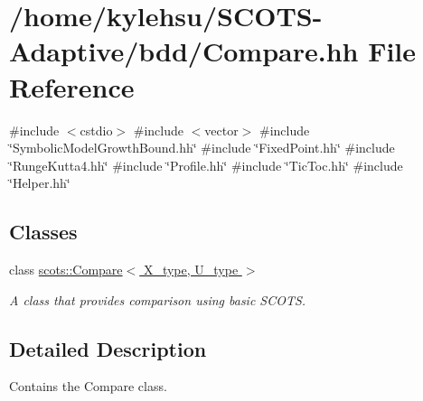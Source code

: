 \hypertarget{Compare_8hh}{}\section{/home/kylehsu/\+S\+C\+O\+T\+S-\/\+Adaptive/bdd/\+Compare.hh File Reference}
\label{Compare_8hh}
{\ttfamily \#include $<$cstdio$>$}\newline
{\ttfamily \#include $<$vector$>$}\newline
{\ttfamily \#include \char`\"{}Symbolic\+Model\+Growth\+Bound.\+hh\char`\"{}}\newline
{\ttfamily \#include \char`\"{}Fixed\+Point.\+hh\char`\"{}}\newline
{\ttfamily \#include \char`\"{}Runge\+Kutta4.\+hh\char`\"{}}\newline
{\ttfamily \#include \char`\"{}Profile.\+hh\char`\"{}}\newline
{\ttfamily \#include \char`\"{}Tic\+Toc.\+hh\char`\"{}}\newline
{\ttfamily \#include \char`\"{}Helper.\+hh\char`\"{}}\newline
\subsection*{Classes}
\begin{DoxyCompactItemize}
\item 
class \hyperlink{classscots_1_1Compare}{scots\+::\+Compare$<$ X\+\_\+type, U\+\_\+type $>$}
\begin{DoxyCompactList}\small\item\em A class that provides comparison using basic S\+C\+O\+TS. \end{DoxyCompactList}\end{DoxyCompactItemize}


\subsection{Detailed Description}
Contains the Compare class. 